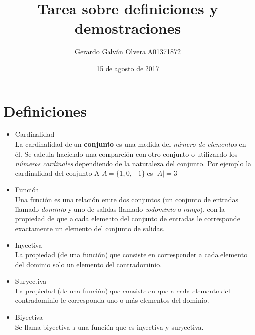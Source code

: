 \documentclass[12pt,a4paper]{article}
\title{Tarea sobre definiciones y demostraciones}
\author{Gerardo Galván Olvera A01371872}
\date{15 de agosto de 2017}
\begin{document}
        \maketitle

        \section{Definiciones}
        \begin{itemize}
            \item Cardinalidad\\
                La cardinalidad de un \textbf{conjunto} es una medida del
                \textit{número de elementos} en él. Se calcula haciendo una comparción con otro conjunto o utilizando los \textit{números cardinales} dependiendo de la naturaleza del conjunto. Por ejemplo la cardinalidad del conjunto A $A = \{1,0,-1\}$ es $|A| = 3$
            \item Función\\
                Una función es una relación entre dos conjuntos (un conjunto de entradas llamado \textit{dominio} y uno de salidas llamado \textit{codominio} o \textit{rango}), con la propiedad de que a cada elemento del conjunto de entradas le corresponde exactamente un elemento del conjunto de salidas.
            \item Inyectiva\\
                La propiedad (de una función) que consiste en corresponder a cada elemento del dominio solo un elemento del contradominio.
            \item Suryectiva\\
                La propiedad (de una función) que consiste en que a cada elemento del contradominio le corresponda uno o más elementos del dominio.
            \item Biyectiva\\
                Se llama biyectiva a una función que es inyectiva y suryectiva.
        \end{itemize}
        
\end{document}
